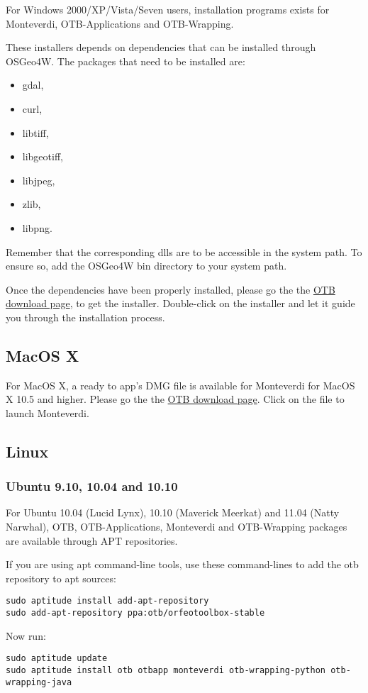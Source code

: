 For Windows 2000/XP/Vista/Seven users, installation programs exists for Monteverdi, 
OTB-Applications and OTB-Wrapping. 

These installers depends on dependencies that can be installed through OSGeo4W. The packages that
need to be installed are:
\begin{itemize}
\item gdal,
\item curl, 
\item libtiff,
\item libgeotiff,
\item libjpeg,
\item zlib, 
\item libpng.
\end{itemize}
Remember that the corresponding dlls are to be accessible in the system path. To ensure so, add
the OSGeo4W bin directory to your system path.

 Once the dependencies have been properly installed, please go the the 
\href{http://sourceforge.net/projects/orfeo-toolbox/}{OTB download page}, to
get the installer. Double-click on the installer and let it guide you through the 
installation process.

\subsection{MacOS X}
\label{ssec:mac_binaries}

For MacOS X, a ready to app's DMG file is available for Monteverdi for MacOS X 10.5 and higher. 
Please go the the \href{http://sourceforge.net/projects/orfeo-toolbox/}{OTB download page}.
Click on the file to launch Monteverdi.

\subsection{Linux}

\subsubsection{Ubuntu 9.10, 10.04 and 10.10}
\label{ssec:ubuntu_binaries}
For Ubuntu 10.04 (Lucid Lynx), 10.10 (Maverick Meerkat) and 11.04 (Natty Narwhal), OTB, 
OTB-Applications, Monteverdi and OTB-Wrapping packages are available through APT repositories.

If you are using apt command-line tools, use these command-lines to add the otb repository to apt sources:
\begin{verbatim}
sudo aptitude install add-apt-repository 
sudo add-apt-repository ppa:otb/orfeotoolbox-stable
\end{verbatim}
Now run:
\begin{verbatim}
sudo aptitude update
sudo aptitude install otb otbapp monteverdi otb-wrapping-python otb-wrapping-java
\end{verbatim}

